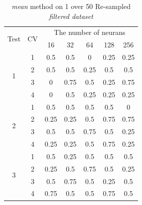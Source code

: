 \documentclass[draft,dvipsnames]{drexel-thesis}
\begin{document}
\begin{thesis}
\begin{table}[!t]
\centering
\caption{{\em mean} method on 1 over 50 Re-sampled {\em filtered dataset}}
\label{tbl:mean_1_50}
\begin{tabular}{|c|c|c|c|c|c|c|}
\hline
\multirow{2}{*}{Test} & \multirow{2}{*}{CV} & \multicolumn{5}{c|}{The number of neurans}                             \\ \cline{3-7}
                      &                     & 16          & 32           & 64          & 128          & 256          \\ \hline
\multirow{4}{*}{1}    & 1                   & 0.5         & 0.5          & 0           & 0.25         & 0.25         \\ \cline{2-7}
                      & 2                   & 0.5         & 0.5          & 0.25        & 0.5          & 0.5          \\ \cline{2-7}
                      & 3                   & 0           & 0.75         & 0.5         & 0.25         & 0.75         \\ \cline{2-7}
                      & 4                   & 0           & 0.5          & 0.25        & 0.25         & 0.25         \\ \hline
\multirow{4}{*}{2}    & 1                   & 0.5         & 0.5          & 0.5         & 0.5          & 0            \\ \cline{2-7}
                      & 2                   & 0.25        & 0.25         & 0.5         & 0.75         & 0.75         \\ \cline{2-7}
                      & 3                   & 0.5         & 0.5          & 0.75        & 0.5          & 0.25         \\ \cline{2-7}
                      & 4                   & 0.25        & 0.25         & 0.5         & 0.75         & 0.25         \\ \hline
\multirow{4}{*}{3}    & 1                   & 0.5         & 0.25         & 0.5         & 0.5          & 0.5          \\ \cline{2-7}
                      & 2                   & 0.25        & 0.5          & 0.75        & 0.5          & 0.25         \\ \cline{2-7}
                      & 3                   & 0.5         & 0.75         & 0.5         & 0.25         & 0.5          \\ \cline{2-7}
                      & 4                   & 0.75        & 0.5          & 0.5         & 0.75         & 0.5          \\ \hline

\end{tabular}
\end{table}
\end{thesis}
\end{document}
